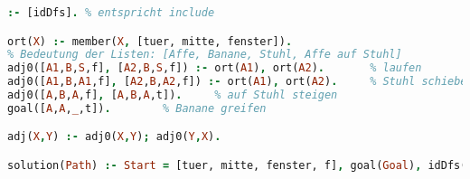 \begin{lstlisting}[language=Prolog]
:- [idDfs].	% entspricht include

ort(X) :- member(X, [tuer, mitte, fenster]).
% Bedeutung der Listen: [Affe, Banane, Stuhl, Affe auf Stuhl]
adj0([A1,B,S,f], [A2,B,S,f]) :- ort(A1), ort(A2).		% laufen
adj0([A1,B,A1,f], [A2,B,A2,f]) :- ort(A1), ort(A2).		% Stuhl schieben
adj0([A,B,A,f], [A,B,A,t]).		% auf Stuhl steigen
goal([A,A,_,t]).		% Banane greifen

adj(X,Y) :- adj0(X,Y); adj0(Y,X).

solution(Path) :- Start = [tuer, mitte, fenster, f], goal(Goal), idDfs(Start,Goal,Path).
\end{lstlisting}





















